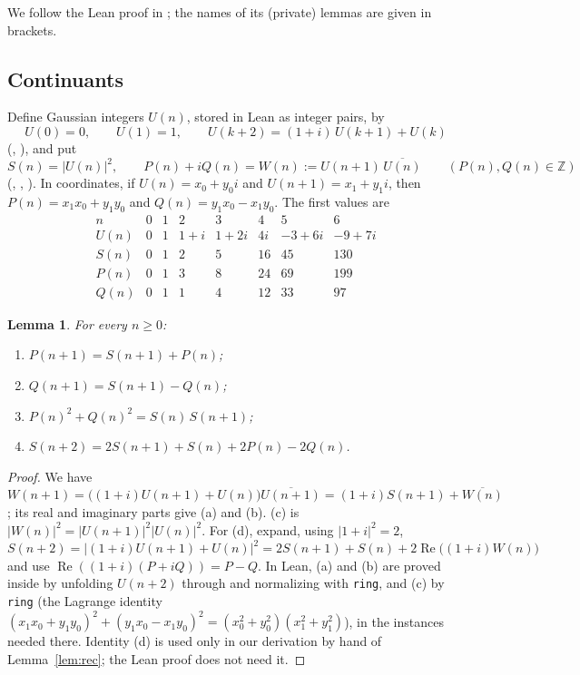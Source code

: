 \documentclass[11pt]{amsart}
\theoremstyle{plain}
\newtheorem{lemma}[theorem]{Lemma}
\theoremstyle{definition}
\newcommand{\Z}{\mathbb{Z}}
\newcommand{\cj}[1]{\overline{#1}}
\DeclareMathOperator{\re}{Re}
\begin{document}
We follow the Lean proof in ; the names of its (private) lemmas are given in brackets.

\subsection{Continuants}
Define Gaussian integers $U(n)$, stored in Lean as integer pairs, by
\[
U(0)=0,\qquad U(1)=1,\qquad U(k+2)=(1+i)\,U(k+1)+U(k)
\]
(, ), and put
\[
S(n)=|U(n)|^2,\qquad P(n)+iQ(n)=W(n):=U(n+1)\,\cj{U(n)}\qquad(P(n),Q(n)\in\Z)
\]
(, , ). In coordinates, if $U(n)=x_0+y_0i$ and $U(n+1)=x_1+y_1i$, then $P(n)=x_1x_0+y_1y_0$ and $Q(n)=y_1x_0-x_1y_0$. The first values are
\[
\begin{array}{c|ccccccc}
n&0&1&2&3&4&5&6\\\hline
U(n)&0&1&1+i&1+2i&4i&-3+6i&-9+7i\\
S(n)&0&1&2&5&16&45&130\\
P(n)&0&1&3&8&24&69&199\\
Q(n)&0&1&1&4&12&33&97
\end{array}
\]

\begin{lemma}\label{lem:step}
For every $n\ge0$:
\begin{enumerate}
\item[(a)] $P(n+1)=S(n+1)+P(n)$;
\item[(b)] $Q(n+1)=S(n+1)-Q(n)$;
\item[(c)] $P(n)^2+Q(n)^2=S(n)\,S(n+1)$;
\item[(d)] $S(n+2)=2S(n+1)+S(n)+2P(n)-2Q(n)$.
\end{enumerate}
\end{lemma}

\begin{proof}
We have
$W(n+1)=\bigl((1+i)U(n+1)+U(n)\bigr)\cj{U(n+1)}=(1+i)S(n+1)+\cj{W(n)}$; its real and imaginary parts give (a) and (b). (c) is $|W(n)|^2=|U(n+1)|^2|U(n)|^2$. For (d), expand, using $|1+i|^2=2$,
$S(n+2)=|(1+i)U(n+1)+U(n)|^2=2S(n+1)+S(n)+2\re\bigl((1+i)W(n)\bigr)$ and use $\re((1+i)(P+iQ))=P-Q$.
In Lean, (a) and (b) are proved inside  by unfolding $U(n+2)$ through  and normalizing with \texttt{ring}, and (c) by \texttt{ring} (the Lagrange identity $(x_1x_0+y_1y_0)^2+(y_1x_0-x_1y_0)^2=(x_0^2+y_0^2)(x_1^2+y_1^2)$), in the instances needed there. Identity (d) is used only in our derivation by hand of Lemma~\ref{lem:rec}; the Lean proof does not need it.
\end{proof}
\end{document}
